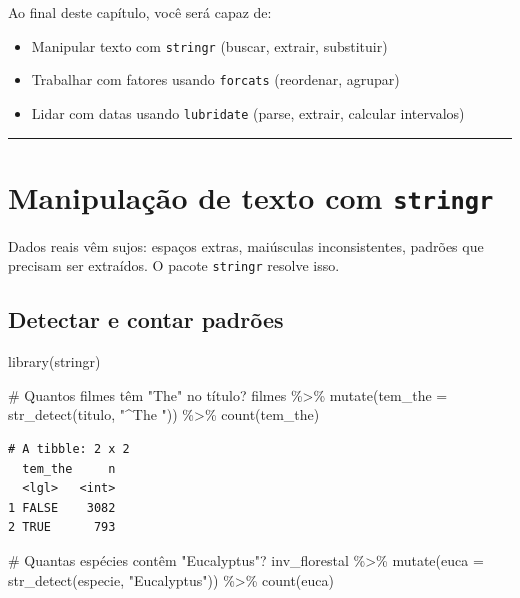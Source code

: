 \documentclass[
  letterpaper,
]{scrbook}
\newenvironment{Shaded}{\begin{snugshade}}{\end{snugshade}}
\newcommand{\AttributeTok}[1]{\textcolor[rgb]{0.40,0.45,0.13}{#1}}
\newcommand{\CommentTok}[1]{\textcolor[rgb]{0.37,0.37,0.37}{#1}}
\newcommand{\FunctionTok}[1]{\textcolor[rgb]{0.28,0.35,0.67}{#1}}
\newcommand{\NormalTok}[1]{\textcolor[rgb]{0.00,0.23,0.31}{#1}}
\newcommand{\SpecialCharTok}[1]{\textcolor[rgb]{0.37,0.37,0.37}{#1}}
\newcommand{\StringTok}[1]{\textcolor[rgb]{0.13,0.47,0.30}{#1}}
\providecommand{\tightlist}{%
  \setlength{\itemsep}{0pt}\setlength{\parskip}{0pt}}
\begin{document}

Ao final deste capítulo, você será capaz de:

\begin{itemize}
\tightlist
\item
  Manipular texto com \texttt{stringr} (buscar, extrair, substituir)
\item
  Trabalhar com fatores usando \texttt{forcats} (reordenar, agrupar)
\item
  Lidar com datas usando \texttt{lubridate} (parse, extrair, calcular
  intervalos)
\end{itemize}

\begin{center}\rule{0.5\linewidth}{0.5pt}\end{center}

\section{\texorpdfstring{Manipulação de texto com
\texttt{stringr}}{Manipulação de texto com stringr}}\label{manipulauxe7uxe3o-de-texto-com-stringr}

Dados reais vêm sujos: espaços extras, maiúsculas inconsistentes,
padrões que precisam ser extraídos. O pacote \texttt{stringr} resolve
isso.

\subsection{Detectar e contar
padrões}\label{detectar-e-contar-padruxf5es}

\begin{Shaded}
\begin{Highlighting}[]
\FunctionTok{library}\NormalTok{(stringr)}

\CommentTok{\# Quantos filmes têm "The" no título?}
\NormalTok{filmes }\SpecialCharTok{\%\textgreater{}\%}
  \FunctionTok{mutate}\NormalTok{(}\AttributeTok{tem\_the =} \FunctionTok{str\_detect}\NormalTok{(titulo, }\StringTok{"\^{}The "}\NormalTok{)) }\SpecialCharTok{\%\textgreater{}\%}
  \FunctionTok{count}\NormalTok{(tem\_the)}
\end{Highlighting}
\end{Shaded}

\begin{verbatim}
# A tibble: 2 x 2
  tem_the     n
  <lgl>   <int>
1 FALSE    3082
2 TRUE      793
\end{verbatim}

\begin{Shaded}
\begin{Highlighting}[]
\CommentTok{\# Quantas espécies contêm "Eucalyptus"?}
\NormalTok{inv\_florestal }\SpecialCharTok{\%\textgreater{}\%}
  \FunctionTok{mutate}\NormalTok{(}\AttributeTok{euca =} \FunctionTok{str\_detect}\NormalTok{(especie, }\StringTok{"Eucalyptus"}\NormalTok{)) }\SpecialCharTok{\%\textgreater{}\%}
  \FunctionTok{count}\NormalTok{(euca)}
\end{Highlighting}
\end{Shaded}
\end{document}

